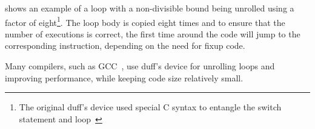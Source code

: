  shows an example of a loop with a non-divisible bound being unrolled using a factor of eight\footnote{The original duff's device used special C syntax to entangle the switch statement and loop~\cite{duff_1983}}.
The loop body is copied eight times and to ensure that the number of executions is correct, the first time around the code will jump to the corresponding instruction, depending on the need for fixup code.

Many compilers, such as GCC~\cite{gcc}, use duff's device for unrolling loops and improving performance, while keeping code size relatively small.




